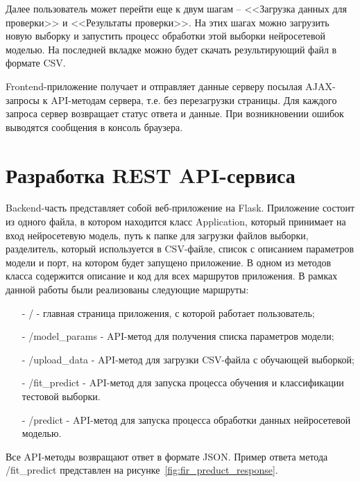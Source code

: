 

Далее пользователь может перейти еще к двум шагам -- <<Загрузка данных для проверки>> и <<Результаты проверки>>. На этих шагах можно загрузить новую выборку и запустить процесс обработки этой выборки нейросетевой моделью. На последней вкладке можно будет скачать результирующий файл в формате CSV.

Frontend-приложение получает и отправляет данные серверу посылая AJAX-запросы к API-методам сервера, т.е. без перезагрузки страницы. Для каждого запроса сервер возвращает статус ответа и данные. При возникновении ошибок выводятся сообщения в консоль браузера.

\section{Разработка REST API-сервиса}

Backend-часть представляет собой веб-приложение на Flask. Приложение состоит из одного файла, в котором находится класс Application, который принимает на вход нейросетевую модель, путь к папке для загрузки файлов выборки, разделитель, который используется в CSV-файле, список с описанием параметров модели и порт, на котором будет запущено приложение. В одном из методов класса содержится описание и код для всех маршрутов приложения. В рамках данной работы были реализованы следующие маршруты:
\begin{itemize}
	\item[-] / - главная страница приложения, с которой работает пользователь;
	\item[-] /model\_params - API-метод для получения списка параметров модели;
	\item[-] /upload\_data - API-метод для загрузки CSV-файла с обучающей выборкой;
	\item[-] /fit\_predict - API-метод для запуска процесса обучения и классификации тестовой выборки.
	\item[-] /predict - API-метод для запуска процесса обработки данных нейросетевой моделью.
\end{itemize}



Все API-методы возвращают ответ в формате JSON. Пример ответа метода /fit\_predict представлен на рисунке~\ref{fig:fir_preduct_response}.




